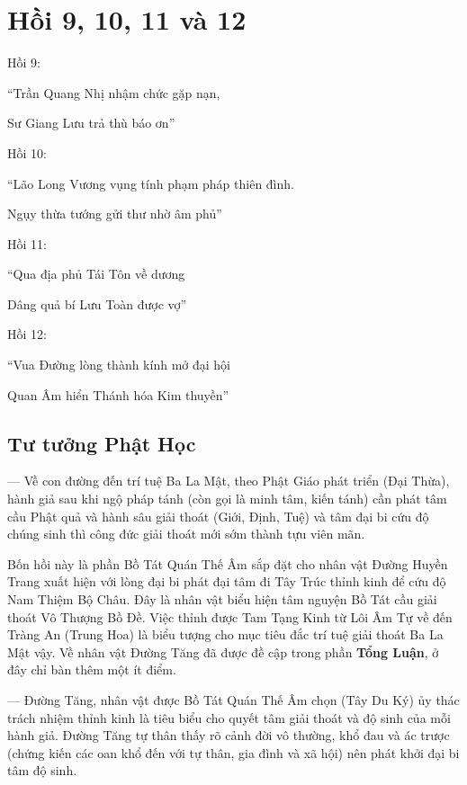 \chapter{Hồi 9, 10, 11 và 12} %
\label{cha:hoi_9_10_11_và_12}
Hồi 9:

\begin{itshape}
``Trần Quang Nhị nhậm chức gặp nạn,

Sư Giang Lưu trả thù báo ơn''
\end{itshape}

Hồi 10:

\begin{itshape}
``Lão Long Vương vụng tính phạm pháp thiên đình.

Ngụy thừa tướng gửi thư nhờ âm phủ''
\end{itshape}

Hồi 11:

\begin{itshape}
``Qua địa phủ Tái Tôn về dương

Dâng quả bí Lưu Toàn được vợ''
\end{itshape}

Hồi 12:

\begin{itshape}
``Vua Đường lòng thành kính mở đại hội

Quan Âm hiển Thánh hóa Kim thuyền''
\end{itshape}

\section{Tư tưởng Phật Học} %
\label{sec:9_phat_hoc}

— Về con đường đến trí tuệ Ba La Mật, theo Phật Giáo phát triển (Đại Thừa), hành giả sau khi ngộ pháp tánh (còn gọi là minh tâm, kiến tánh) cần phát tâm cầu Phật quả và hành sâu giải thoát (Giới, Định, Tuệ) và tâm đại bi cứu độ chúng sinh thì công đức giải thoát mới sớm thành tựu viên mãn.

Bốn hồi này là phần Bồ Tát Quán Thế Âm sắp đặt cho nhân vật Đường Huyền Trang xuất hiện với lòng đại bi phát đại tâm đi Tây Trúc thỉnh kinh để cứu độ Nam Thiệm Bộ Châu. Đây là nhân vật biểu hiện tâm nguyện Bồ Tát cầu giải thoát Vô Thượng Bồ Đề. Việc thỉnh được Tam Tạng Kinh từ Lôi Âm Tự về đến Tràng An (Trung Hoa) là biểu tượng cho mục tiêu đắc trí tuệ giải thoát Ba La Mật vậy. Về nhân vật Đường Tăng đã được đề cập trong phần {\bf Tổng Luận}, ở đây chỉ bàn thêm một ít điểm.

— Đường Tăng, nhân vật được Bồ Tát Quán Thế Âm chọn (Tây Du Ký) ủy thác trách nhiệm thỉnh kinh là tiêu biểu cho quyết tâm giải thoát và độ sinh của mỗi hành giả. Đường Tăng tự thân thấy rõ cảnh đời vô thường, khổ đau và ác trược (chứng kiến các oan khổ đến với tự thân, gia đình và xã hội) nên phát khởi đại bi tâm độ sinh.

